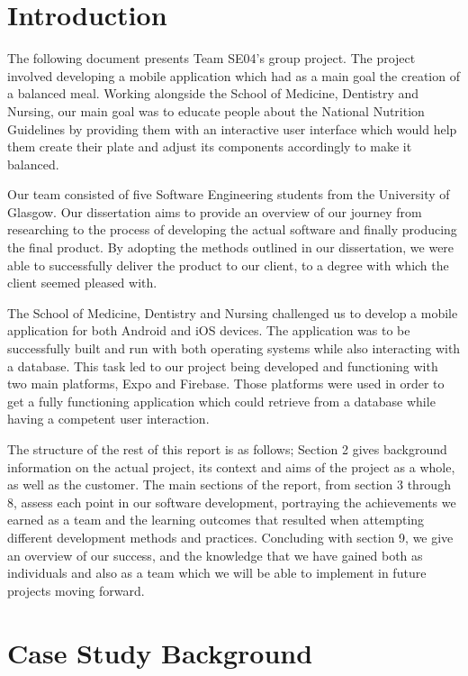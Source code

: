 \documentclass{l3proj}
\begin{document}
\section{Introduction}
The following document presents Team SE04's group project. The project involved developing a mobile application which had as a main goal the creation of a balanced meal. Working alongside the School of Medicine, Dentistry and Nursing, our main goal was to educate people about the National Nutrition Guidelines by providing them with an interactive user interface which would help them create their plate and adjust its components accordingly to make it balanced. \par
Our team consisted of five Software Engineering students from the University of Glasgow. Our dissertation aims to provide an overview of our journey from researching to the process of developing the actual software and finally producing the final product. By adopting the methods outlined in our dissertation, we were able to successfully deliver the product to our client, to a degree with which the client seemed pleased with.\par
The School of Medicine, Dentistry and Nursing challenged us to develop a mobile application for both Android and iOS devices. The application was to be successfully built and run with both operating systems while also interacting with a database. This task led to our project being developed and functioning with two main platforms, Expo and Firebase. Those platforms were used in order to get a fully functioning application which could retrieve from a database while having a competent user interaction.\par

The structure of the rest of this report is as follows; Section 2 gives background information on the actual project, its context and aims of the project as a whole, as well as the customer. The main sections of the report, from section 3 through 8, assess each point in our software development, portraying the achievements we earned as a team and the learning outcomes that resulted when attempting different development methods and practices. Concluding with section 9, we give an overview of our success, and the knowledge that we have gained both as individuals and also as a team which we will be able to implement in future projects moving forward.\par
\section{Case Study Background}
\label{case study background}
\end{document}
